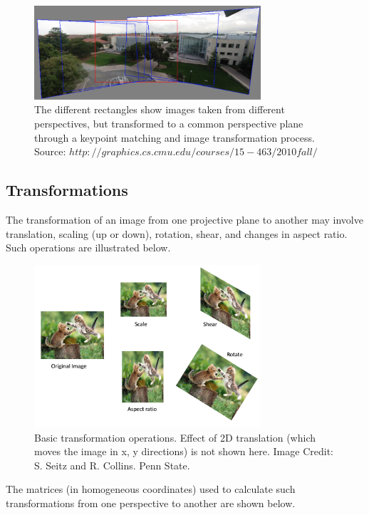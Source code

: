 \documentclass{article}
\begin{document}
\begin{figure}[h]
  \centering
  \includegraphics[width=0.75\textwidth]{cmu_composite_panorama.png}
  \caption{The different rectangles show images taken from different perspectives, but transformed to a common perspective plane through a keypoint matching and image transformation process. Source: $ http://graphics.cs.cmu.edu/courses/15-463/2010 fall/$}
\end{figure}

\subsection{Transformations}
The transformation of an image from one projective plane to another may involve translation, scaling (up or down), rotation, shear, and changes in aspect ratio. Such operations are illustrated below.

\begin{figure}[h]
  \centering
  \includegraphics[width=0.75\textwidth]{transforms.png}
  \caption{Basic transformation operations. Effect of 2D translation (which moves the image in x, y directions) is not shown here. Image Credit: S. Seitz and R. Collins. Penn State.}
\end{figure}

The matrices (in homogeneous coordinates) used to calculate such transformations from one perspective to another are shown below.
\end{document}
